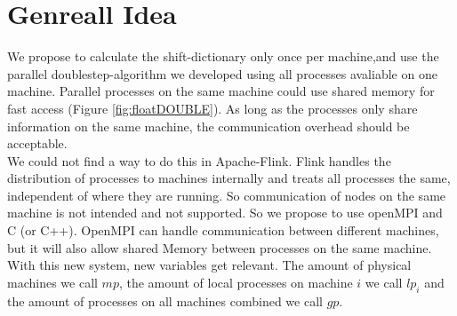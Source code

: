 \documentclass[12pt]{article}
\begin{document}
\section{Genreall Idea}

We propose to calculate the shift-dictionary only once per machine,and use the parallel doublestep-algorithm we developed using all processes avaliable on one machine. Parallel processes on the same machine could use shared memory for fast access (Figure \ref{fig:floatDOUBLE}). As long as the processes only share information on the same machine, the communication overhead should be acceptable.\\

We could not find a way to do this in Apache-Flink. Flink handles the distribution of processes to machines internally and treats all processes the same, independent of where they are running. So communication of nodes on the same machine is not intended and not supported. So we propose to use openMPI and C (or C++). OpenMPI can handle communication between different machines, but it will also allow shared Memory between processes on the same machine.\\

With this new system, new variables get relevant. The amount of physical machines we call $mp$, the amount of local processes on machine $i$ we call $lp_i$ and the amount of processes on all machines combined we call $gp$.
\end{document}

